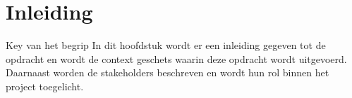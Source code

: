 \chapter{Inleiding}
\gls{Key van het begrip}
In dit hoofdstuk wordt er een inleiding gegeven tot de opdracht en wordt de context geschets waarin deze opdracht wordt uitgevoerd.
Daarnaast worden de stakeholders beschreven en wordt hun rol binnen het project toegelicht.






